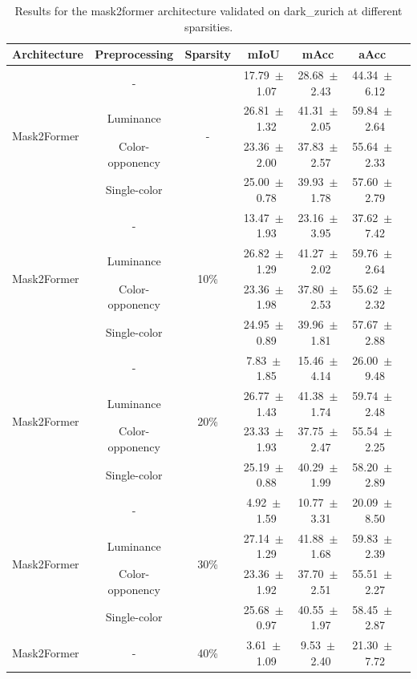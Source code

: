 \begin{table}[h]
\centering
\caption{Results for the mask2former architecture validated on dark_zurich at different sparsities.}
\begin{tabular}{@{}lccc ccc@{}}
\toprule
Architecture & Preprocessing & Sparsity & mIoU & mAcc & aAcc \\
\midrule

\multirow{4}{*}{Mask2Former} & - & \multirow{4}{*}{-} & 17.79~$\pm$~1.07 & 28.68~$\pm$~2.43 & 44.34~$\pm$~6.12 \\
& Luminance & & 26.81~$\pm$~1.32 & 41.31~$\pm$~2.05 & 59.84~$\pm$~2.64 \\
& Color-opponency & & 23.36~$\pm$~2.00 & 37.83~$\pm$~2.57 & 55.64~$\pm$~2.33 \\
& Single-color & & 25.00~$\pm$~0.78 & 39.93~$\pm$~1.78 & 57.60~$\pm$~2.79 \\
\midrule
\multirow{4}{*}{Mask2Former} & - & \multirow{4}{*}{10\%} & 13.47~$\pm$~1.93 & 23.16~$\pm$~3.95 & 37.62~$\pm$~7.42 \\
& Luminance & & 26.82~$\pm$~1.29 & 41.27~$\pm$~2.02 & 59.76~$\pm$~2.64 \\
& Color-opponency & & 23.36~$\pm$~1.98 & 37.80~$\pm$~2.53 & 55.62~$\pm$~2.32 \\
& Single-color & & 24.95~$\pm$~0.89 & 39.96~$\pm$~1.81 & 57.67~$\pm$~2.88 \\
\midrule
\multirow{4}{*}{Mask2Former} & - & \multirow{4}{*}{20\%} & 7.83~$\pm$~1.85 & 15.46~$\pm$~4.14 & 26.00~$\pm$~9.48 \\
& Luminance & & 26.77~$\pm$~1.43 & 41.38~$\pm$~1.74 & 59.74~$\pm$~2.48 \\
& Color-opponency & & 23.33~$\pm$~1.93 & 37.75~$\pm$~2.47 & 55.54~$\pm$~2.25 \\
& Single-color & & 25.19~$\pm$~0.88 & 40.29~$\pm$~1.99 & 58.20~$\pm$~2.89 \\
\midrule
\multirow{4}{*}{Mask2Former} & - & \multirow{4}{*}{30\%} & 4.92~$\pm$~1.59 & 10.77~$\pm$~3.31 & 20.09~$\pm$~8.50 \\
& Luminance & & 27.14~$\pm$~1.29 & 41.88~$\pm$~1.68 & 59.83~$\pm$~2.39 \\
& Color-opponency & & 23.36~$\pm$~1.92 & 37.70~$\pm$~2.51 & 55.51~$\pm$~2.27 \\
& Single-color & & 25.68~$\pm$~0.97 & 40.55~$\pm$~1.97 & 58.45~$\pm$~2.87 \\
\midrule
\multirow{4}{*}{Mask2Former} & - & \multirow{4}{*}{40\%} & 3.61~$\pm$~1.09 & 9.53~$\pm$~2.40 & 21.30~$\pm$~7.72 \\

\end{tabular}
\end{table}
